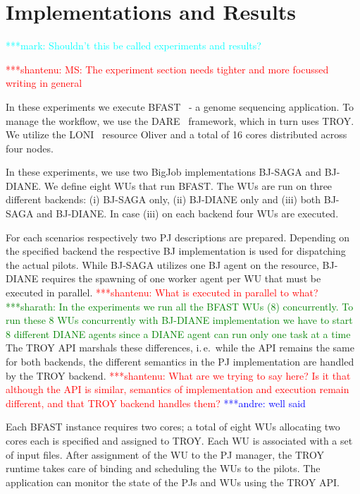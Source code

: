 \documentclass[conference,final]{IEEEtran}
\newcommand{\jhanote}[1]{ {\textcolor{red} { ***shantenu: #1 }}}
\newcommand{\alnote}[1]{ {\textcolor{blue} { ***andre: #1 }}}
\newcommand{\smnote}[1]{ {\textcolor{green} { ***sharath: #1 }}}
\newcommand{\msnote}[1]{ {\textcolor{cyan} { ***mark: #1 }}}
\newcommand{\alnote}[1]{}
\newcommand{\smnote}[1]{}
\newcommand{\jhanote}[1]{}
\newcommand{\msnote}[1]{}
\newcommand{\upp}{\vspace*{-0.5em}}
\begin{document}
\section{Implementations and Results\upp\upp}
\msnote{Shouldn't this be called experiments and results?}

\jhanote{MS: The experiment section needs tighter and more focussed
  writing in general}

In these experiments we execute BFAST~\cite{bfast2009} - a genome
sequencing application. To manage the workflow, we use the
DARE~\cite{dare-tg11} framework, which in turn uses TROY.  We utilize
the LONI~\cite{loni}  resource Oliver and a total of 16 cores
distributed across four nodes.

In these experiments, we use two BigJob implementations BJ-SAGA and
BJ-DIANE. We define eight WUs that run BFAST. The WUs are run on three
different backends: (i) BJ-SAGA only, (ii) BJ-DIANE only and (iii)
both BJ-SAGA and BJ-DIANE. In case (iii) on each backend four WUs are
executed.

For each scenarios respectively two PJ descriptions are prepared. Depending on
the specified backend the respective BJ implementation is used for dispatching
the actual pilots. While BJ-SAGA utilizes one BJ agent on the resource, BJ-DIANE
requires the spawning of one worker agent per WU that must be executed in
parallel. \jhanote{What is executed in parallel to what?} \smnote{In the
experiments we run all the BFAST WUs (8) concurrently. To run these 8 WUs
concurrently with BJ-DIANE implementation we have to start 8 different DIANE
agents since a DIANE agent can run only one task at a time}The TROY API marshals
these differences, i.\,e.\ while the API remains the same for both backends,
the different semantics in the PJ implementation are handled by the TROY 
backend.
\jhanote{What are we trying to say here?  Is it that although the API
  is similar, semantics of implementation and execution remain
  different, and that TROY backend handles them?}\alnote{well said}

Each BFAST instance requires two cores; a total of eight WUs
allocating two cores each is specified and assigned to TROY. Each WU
is associated with a set of input files. After assignment of the WU to
the PJ manager, the TROY runtime takes care of binding and scheduling
the WUs to the pilots. The application can monitor the state of the
PJs and WUs using the TROY API.
\end{document}
